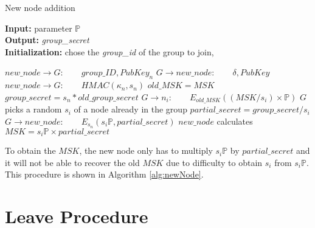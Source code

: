 \begin{algorithm}[H]
\caption{New node addition }\label{alg:newNode}
\hspace*{\algorithmicindent} \textbf{Input:} parameter $\mathbb{P}$ \\
\hspace*{\algorithmicindent} \textbf{Output:} \textit{group\_secret} \\
\hspace*{\algorithmicindent} \textbf{Initialization:} chose the \textit{group\_id} of the group to join,\\
\begin{algorithmic}[1]
\State $new\_node \rightarrow G:\qquad group\_ID, PubKey_n$
\State $G \rightarrow new\_node:\qquad \delta, PubKey$
\State $new\_node \rightarrow G:\qquad HMAC(\kappa_n, s_n)$
\State $old\_MSK = MSK$
\State $group\_secret = s_n * old\_group\_secret$
\State $G \rightarrow n_i: \qquad E_{old\_MSK}( (MSK / s_i) \times \mathbb{P})$
\EndFor{}
\State $G$ picks a random $s_i$ of a node already in the group
\State $partial\_secret = group\_secret / s_i$
\State $G \rightarrow new\_node: \qquad E_{s_n}(s_{i}\mathbb{P}, partial\_secret)$
\State $new\_node$ calculates $MSK = s_{i}\mathbb{P} \times partial\_secret$\\
\EndIf
{}
\end{algorithmic}
\end{algorithm}

To obtain the $MSK$, the new node only has to multiply $s_{i}\mathbb{P}$ by $partial\_secret$ and it will not be able to recover the old $MSK$ due to difficulty to obtain $s_i$ from $s_{i}\mathbb{P}$.  %
This procedure is shown in Algorithm \ref{alg:newNode}.

\section{Leave Procedure}

